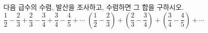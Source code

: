 다음 급수의 수렴, 발산을 조사하고, 수렴하면 그 합을 구하시오.
 $\dfrac{1}{2}-\dfrac{2}{3}+\dfrac{2}{3}-\dfrac{3}{4}+\dfrac{3}{4}-\dfrac{4}{5}+\cdots$
 $\left(\dfrac{1}{2}-\dfrac{2}{3}\right)+\left(\dfrac{2}{3}-\dfrac{3}{4}\right)+\left(\dfrac{3}{4}-\dfrac{4}{5}\right)+\cdots$
